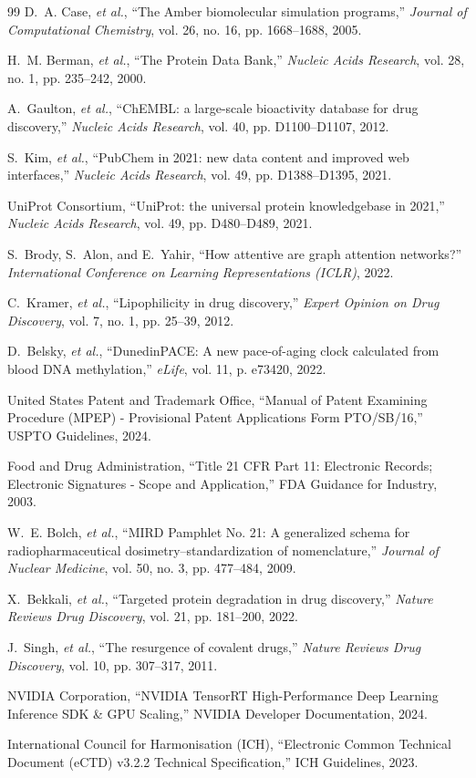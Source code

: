 \documentclass[10pt,journal,compsoc]{IEEEtran}
\begin{document}
\begin{thebibliography}{99}
D.~A. Case, \emph{et al.}, ``The Amber biomolecular simulation programs,'' \emph{Journal of Computational Chemistry}, vol. 26, no. 16, pp. 1668--1688, 2005.

H.~M. Berman, \emph{et al.}, ``The Protein Data Bank,'' \emph{Nucleic Acids Research}, vol. 28, no. 1, pp. 235--242, 2000.

A.~Gaulton, \emph{et al.}, ``ChEMBL: a large-scale bioactivity database for drug discovery,'' \emph{Nucleic Acids Research}, vol. 40, pp. D1100--D1107, 2012.

S.~Kim, \emph{et al.}, ``PubChem in 2021: new data content and improved web interfaces,'' \emph{Nucleic Acids Research}, vol. 49, pp. D1388--D1395, 2021.

UniProt Consortium, ``UniProt: the universal protein knowledgebase in 2021,'' \emph{Nucleic Acids Research}, vol. 49, pp. D480--D489, 2021.

S.~Brody, S.~Alon, and E.~Yahir, ``How attentive are graph attention networks?'' \emph{International Conference on Learning Representations (ICLR)}, 2022.

C.~Kramer, \emph{et al.}, ``Lipophilicity in drug discovery,'' \emph{Expert Opinion on Drug Discovery}, vol. 7, no. 1, pp. 25--39, 2012.

D.~Belsky, \emph{et al.}, ``DunedinPACE: A new pace-of-aging clock calculated from blood DNA methylation,'' \emph{eLife}, vol. 11, p. e73420, 2022.

United States Patent and Trademark Office, ``Manual of Patent Examining Procedure (MPEP) - Provisional Patent Applications Form PTO/SB/16,'' USPTO Guidelines, 2024.

Food and Drug Administration, ``Title 21 CFR Part 11: Electronic Records; Electronic Signatures - Scope and Application,'' FDA Guidance for Industry, 2003.

W.~E. Bolch, \emph{et al.}, ``MIRD Pamphlet No. 21: A generalized schema for radiopharmaceutical dosimetry--standardization of nomenclature,'' \emph{Journal of Nuclear Medicine}, vol. 50, no. 3, pp. 477--484, 2009.

X.~Bekkali, \emph{et al.}, ``Targeted protein degradation in drug discovery,'' \emph{Nature Reviews Drug Discovery}, vol. 21, pp. 181--200, 2022.

J.~Singh, \emph{et al.}, ``The resurgence of covalent drugs,'' \emph{Nature Reviews Drug Discovery}, vol. 10, pp. 307--317, 2011.

NVIDIA Corporation, ``NVIDIA TensorRT High-Performance Deep Learning Inference SDK \& GPU Scaling,'' NVIDIA Developer Documentation, 2024.

International Council for Harmonisation (ICH), ``Electronic Common Technical Document (eCTD) v3.2.2 Technical Specification,'' ICH Guidelines, 2023.

\end{thebibliography}
\end{document}
